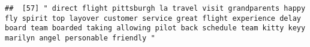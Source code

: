 \documentclass[
]{article}
\begin{document}
\begin{verbatim}
##  [57] " direct flight pittsburgh la travel visit grandparents happy fly spirit top layover customer service great flight experience delay board team boarded taking allowing pilot back schedule team kitty keyy marilyn angel personable friendly "                                                                                                                                                                                                                                                                                                                                                                                                                                                                                                                                                                                                                                                                                                                                                                                                                                                                                                                                                                                                                                                                                                                                                                                                                                                                                                                                                                                                                                                                                                                                                  

\end{verbatim}
\end{document}
